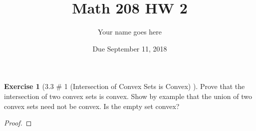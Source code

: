 \documentclass[11pt]{article}		%
\title{Math 208 HW 2}
\author{Your name goes here}
\date{Due September 11, 2018}
\theoremstyle{definition}
\newtheorem{exercise}[theorem]{Exercise}
\begin{document}
	\maketitle
	
	
	
	\begin{exercise}[3.3 \# 1 (Intersection of Convex Sets is Convex) ]
		Prove that the intersection of two convex sets is convex.  Show by example that the union of two convex sets need not be convex.  Is the empty set convex?
	\end{exercise}
	
	\begin{proof} 
		
	\end{proof}
	
	
	
	
\end{document}
